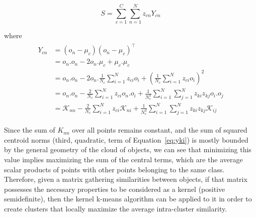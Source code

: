 \documentclass[twoside,11pt]{article}
\begin{document}
\[
S = \sum_{c=1}^{C} \sum_{n=1}^{N} z_{cn} Y_{cn}
\]

where
\begin{align}
\begin{split}
Y_{cn} & =  \left(o_n-\mu_c\right)\left(o_n-\mu_c\right)^\top \\
       & =  o_n.o_n - 2 o_n.\mu_c + \mu_c.\mu_c \\
       & =  o_n.o_n - 2 o_n.\frac{1}{N_c} \sum_{i=1}^{N} z_{ci} o_i +
       	 \left(\frac{1}{N_c} \sum_{i=1}^{N} z_{ci} o_i\right)^2 \\ %
       & =  o_n.o_n - \frac{2}{N_c} \sum_{i=1}^{N} z_{ci} o_n.o_i +
       	 \frac{1}{N_c^2} \sum_{i=1}^{N} \sum_{j=1}^{N} z_{ki} z_{kj} o_i.o_j \\
       & =  \mathcal{K}_{nn} - \frac{2}{N_c} \sum_{i=1}^{N} z_{ci} \mathcal{K}_{ni} +
         \frac{1}{N_c^2} \sum_{i=1}^{N} \sum_{j=1}^{N} z_{ki} z_{kj} \mathcal{K}_{ij} \label{eq:yki}
\end{split}
\end{align}



Since the sum of $K_{nn}$ over all points remains constant, and the sum of squared centroid norms (third, quadratic, term of Equation~\ref{eq:yki}) is mostly bounded by the general geometry of the cloud of objects, we can see that minimizing this value implies maximizing the sum of the central terms, which are the average scalar products of points with other points belonging to the same class. Therefore, given a matrix gathering similarities between objects, if that matrix possesses the necessary properties to be considered as a kernel (positive semidefinite), then the kernel k-means algorithm can be applied to it in order to create clusters that locally maximize the average intra-cluster similarity.
\end{document}
